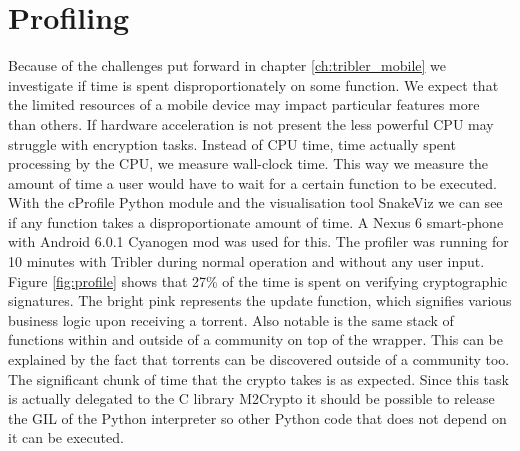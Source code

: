 \section{Profiling}
Because of the challenges put forward in chapter \ref{ch:tribler_mobile} we investigate if time is spent disproportionately on some function.
We expect that the limited resources of a mobile device may impact particular features more than others.
If hardware acceleration is not present the less powerful CPU may struggle with encryption tasks.
Instead of CPU time, time actually spent processing by the CPU, we measure wall-clock time.
This way we measure the amount of time a user would have to wait for a certain function to be executed.
With the cProfile Python module and the visualisation tool SnakeViz we can see if any function takes a disproportionate amount of time.
A Nexus 6 smart-phone with Android 6.0.1 Cyanogen mod was used for this.
The profiler was running for 10 minutes with Tribler during normal operation and without any user input.
Figure \ref{fig:profile} shows that 27\% of the time is spent on verifying cryptographic signatures.
The bright pink represents the update function, which signifies various business logic upon receiving a torrent.
Also notable is the same stack of functions within and outside of a community on top of the wrapper.
This can be explained by the fact that torrents can be discovered outside of a community too.
The significant chunk of time that the crypto takes is as expected.
Since this task is actually delegated to the C library M2Crypto it should be possible to release the GIL of the Python interpreter so other Python code that does not depend on it can be executed.


